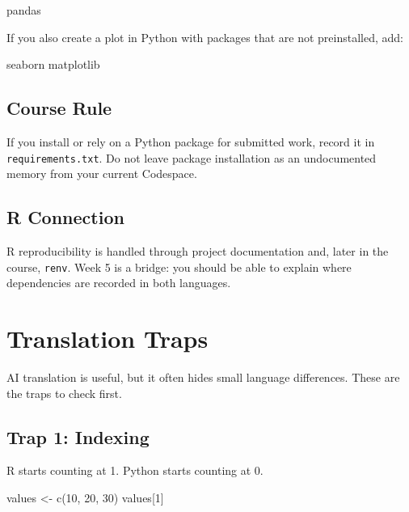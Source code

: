 \documentclass[
  letterpaper,
  DIV=11,
  numbers=noendperiod,
  oneside]{scrreprt}
\newenvironment{Shaded}{\begin{snugshade}}{\end{snugshade}}
\newcommand{\DecValTok}[1]{\textcolor[rgb]{0.68,0.00,0.00}{#1}}
\newcommand{\FunctionTok}[1]{\textcolor[rgb]{0.28,0.35,0.67}{#1}}
\newcommand{\NormalTok}[1]{\textcolor[rgb]{0.00,0.23,0.31}{#1}}
\newcommand{\OtherTok}[1]{\textcolor[rgb]{0.00,0.23,0.31}{#1}}
\begin{document}
\begin{Shaded}
\begin{Highlighting}[numbers=left,,]
\NormalTok{pandas}
\end{Highlighting}
\end{Shaded}

If you also create a plot in Python with packages that are not
preinstalled, add:

\begin{Shaded}
\begin{Highlighting}[numbers=left,,]
\NormalTok{seaborn}
\NormalTok{matplotlib}
\end{Highlighting}
\end{Shaded}

\section{Course Rule}\label{course-rule}

If you install or rely on a Python package for submitted work, record it
in \texttt{requirements.txt}. Do not leave package installation as an
undocumented memory from your current Codespace.

\section{R Connection}\label{r-connection}

R reproducibility is handled through project documentation and, later in
the course, \texttt{renv}. Week 5 is a bridge: you should be able to
explain where dependencies are recorded in both languages.

\chapter{Translation Traps}\label{translation-traps}

AI translation is useful, but it often hides small language differences.
These are the traps to check first.

\section{Trap 1: Indexing}\label{trap-1-indexing}

R starts counting at 1. Python starts counting at 0.

\begin{Shaded}
\begin{Highlighting}[numbers=left,,]
\NormalTok{values }\OtherTok{\textless{}{-}} \FunctionTok{c}\NormalTok{(}\DecValTok{10}\NormalTok{, }\DecValTok{20}\NormalTok{, }\DecValTok{30}\NormalTok{)}
\NormalTok{values[}\DecValTok{1}\NormalTok{]}
\end{Highlighting}
\end{Shaded}
\end{document}

